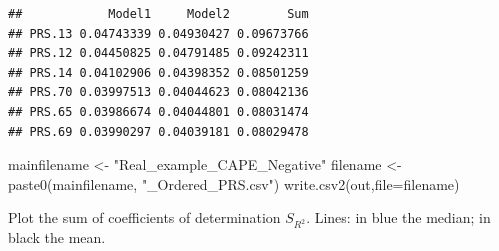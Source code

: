 \documentclass[
]{article}
\newenvironment{Shaded}{\begin{snugshade}}{\end{snugshade}}
\newcommand{\AttributeTok}[1]{\textcolor[rgb]{0.77,0.63,0.00}{#1}}
\newcommand{\FunctionTok}[1]{\textcolor[rgb]{0.00,0.00,0.00}{#1}}
\newcommand{\NormalTok}[1]{#1}
\newcommand{\OtherTok}[1]{\textcolor[rgb]{0.56,0.35,0.01}{#1}}
\newcommand{\StringTok}[1]{\textcolor[rgb]{0.31,0.60,0.02}{#1}}
\begin{document}
\begin{verbatim}
##            Model1     Model2        Sum
## PRS.13 0.04743339 0.04930427 0.09673766
## PRS.12 0.04450825 0.04791485 0.09242311
## PRS.14 0.04102906 0.04398352 0.08501259
## PRS.70 0.03997513 0.04044623 0.08042136
## PRS.65 0.03986674 0.04044801 0.08031474
## PRS.69 0.03990297 0.04039181 0.08029478
\end{verbatim}

\begin{Shaded}
\begin{Highlighting}[]
\NormalTok{mainfilename }\OtherTok{\textless{}{-}} \StringTok{"Real\_example\_CAPE\_Negative"}
\NormalTok{filename }\OtherTok{\textless{}{-}} \FunctionTok{paste0}\NormalTok{(mainfilename, }\StringTok{"\_Ordered\_PRS.csv"}\NormalTok{)}
\FunctionTok{write.csv2}\NormalTok{(out,}\AttributeTok{file=}\NormalTok{filename)}
\end{Highlighting}
\end{Shaded}

Plot the sum of coefficients of determination \(S_{R^2}\). Lines: in
blue the median; in black the mean.
\end{document}
